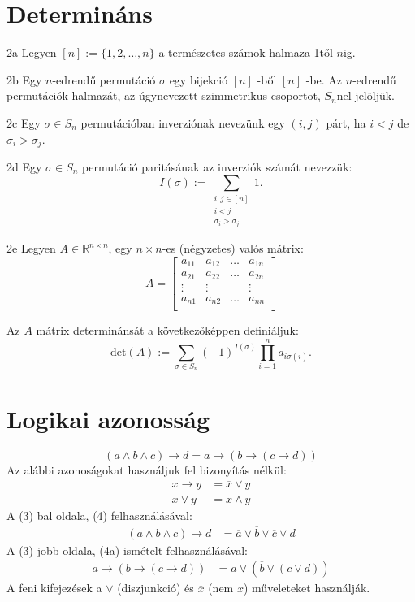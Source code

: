 \documentclass{article}
\theoremstyle{remark}
\begin{document}
\section{Determináns}
\begin{tétel}{2a}
Legyen
\([n] := \{1, 2, \ldots, n\}\) a természetes számok halmaza 1től \(n\)ig.
\end{tétel}
\begin{tétel}{2b}
Egy \(n\)-edrendű permutáció \(\sigma\) egy bijekció \([n]\) -ből \([n]\) -be. Az \(n\)-edrendű permutációk halmazát, az úgynevezett szimmetrikus csoportot, \(S_n\)nel jelöljük.
\end{tétel}
\begin{tétel}{2c}
Egy \(\sigma \in S_n\) permutációban inverziónak nevezünk egy \((i, j)\) párt, ha \(i < j\) de \(\sigma_i > \sigma_j\).
\end{tétel}
\begin{tétel}{2d}
Egy \(\sigma \in S_n\) permutáció paritásának az inverziók számát nevezzük:
\[I(\sigma) := \sum_{\substack{i, j \in [n] \\ i < j \\ \sigma_i > \sigma_j}} 1.\]
\end{tétel}
\begin{tétel}{2e}
Legyen \(A \in \mathbb{R}^{n \times n}\), egy \(n \times n\)-es (négyzetes) valós mátrix:
\[
A=
\begin{bmatrix}
a_{11} & a_{12} & \ldots & a_{1n} \\
a_{21} & a_{22} & \ldots & a_{2n} \\
\vdots & \vdots & & \vdots \\
a_{n1} & a_{n2} & \ldots & a_{nn} \\
\end{bmatrix}
\]
\end{tétel}
Az \(A\) mátrix determinánsát a következőképpen definiáljuk:
\[
\text{det}(A) := \sum_{\sigma \in S_n} (-1)^{I(\sigma)} \prod_{i=1}^{n} a_{i\sigma(i)}.
\]
\section{Logikai azonosság}
\begin{equation}
(a \land b \land c) \rightarrow d = a \rightarrow (b \rightarrow (c \rightarrow d)) \tag{3}
\end{equation}
Az alábbi azonoságokat használjuk fel bizonyítás nélkül:
\begin{align}
x \rightarrow y &= \overline{x} \lor y \tag{4a} \\
x \lor y &= \overline{x} \land \overline{y} \tag{4b}
\end{align}
A (3) bal oldala, (4) felhasználásával:
\begin{align}
(a \land b \land c) \rightarrow d &= \overline{a} \lor \overline{b} \lor \overline{c} \lor d \tag{5}
\end{align}
A (3) jobb oldala, (4a) ismételt felhasználásával:
\begin{align}
a \rightarrow (b \rightarrow (c \rightarrow d)) &= \overline{a} \lor (\overline{b} \lor (\overline{c} \lor d)) \tag{6}
\end{align}
A feni kifejezések a $\lor$ (diszjunkció) és $\overline{x}$ (nem $x$) műveleteket használják.
\end{document}
